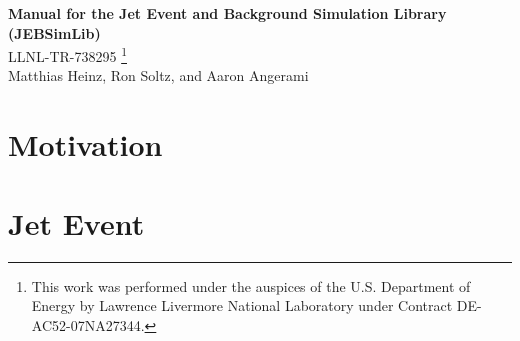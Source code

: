 \documentclass[11pt]{article}
\begin{document}
\renewcommand{\textfraction}{0.1}
\renewcommand{\topfraction}{0.9}
\renewcommand{\bottomfraction}{0.9}
\renewcommand{\floatpagefraction}{0.1}

\begin{center}
{\Large \bf Manual for the Jet Event and Background Simulation Library (JEBSimLib)}\\
\bigskip
LLNL-TR-738295
\footnote{This work was performed under the auspices of the U.S. Department of Energy by Lawrence Livermore National Laboratory under Contract DE-AC52-07NA27344.}
\\
\bigskip
Matthias Heinz, Ron Soltz, and Aaron Angerami
\end{center}

\begin{abstract}
Jets are the collimated streams of particles resulting from hard scattering in the initial state of high-energy collisions. In heavy-ion collisions, jets interact with the quark-gluon plasma (QGP) before freezeout, providing a probe into the internal structure and properties of the QGP. In order to study jets, background must be subtracted from the measured event, potentially introducing a bias. We aim to understand and quantify this subtraction bias. PYTHIA, a library to simulate pure jet events, is used to simulate a model for a signature with one pure jet (a photon) and one quenched jet, where all quenched particle momenta are reduced by a user-defined constant fraction. Background for the event is simulated using multiplicity values generated by the TRENTO initial state model of heavy-ion collisions fed into a thermal model consisting of a 3-dimensional Boltzmann distribution for particle types and momenta. Data from the simulated events is used to train a statistical model, which computes a posterior distribution of the quench factor for a data set. The model was tested first on pure jet events and then on full events including the background. This model will allow for a quantitative determination of biases induced by various methods of background subtraction.
\end{abstract}

\section{Motivation}

\section{Jet Event}
\end{document}
